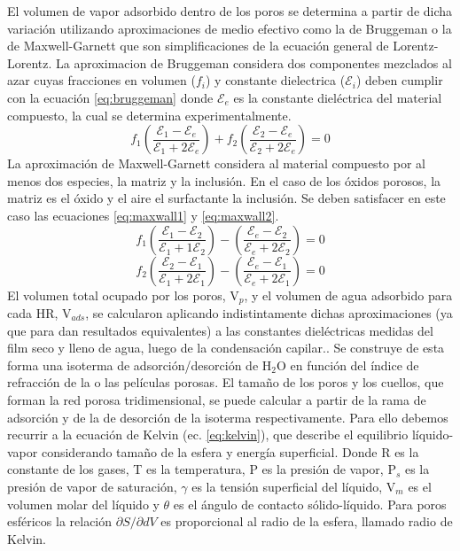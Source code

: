 		El volumen de vapor adsorbido dentro de los poros se determina a partir de dicha variación utilizando aproximaciones de medio efectivo como la de Bruggeman\cite{Bruggeman1935} o la de Maxwell-Garnett\cite{Garnett1906} que son simplificaciones de la ecuación general de Lorentz-Lorentz\cite{TompkinsHarlandG.1999}.
		La aproximacion de Bruggeman considera dos componentes mezclados al azar cuyas fracciones en volumen ($f_i$) y constante dielectrica ($\mathcal{E}_i$) deben cumplir con la ecuación \ref{eq:bruggeman} donde $\mathcal{E}_e$ es la constante dieléctrica del material compuesto, la cual se determina experimentalmente.
							\begin{equation}
					 		   	 f_1\left(\frac{\mathcal{E}_1-\mathcal{E}_e}{\mathcal{E}_1+2\mathcal{E}_e}\right)+
					 		   	 f_2\left(\frac{\mathcal{E}_2-\mathcal{E}_e}{\mathcal{E}_2+2\mathcal{E}_e}\right)=0
					 		     \label{eq:bruggeman}
								\end{equation}
		La aproximación de Maxwell-Garnett considera al material compuesto por al menos dos especies, la matriz y la inclusión. En el caso de los óxidos porosos, la matriz es el óxido y el aire el surfactante la inclusión. Se deben satisfacer en este caso las ecuaciones \ref{eq:maxwall1} y \ref{eq:maxwall2}.
							\begin{equation}
					 		   	 f_1\left(\frac{\mathcal{E}_1-\mathcal{E}_2}{\mathcal{E}_1+1\mathcal{E}_2}\right)-
					 		   	 \left(\frac{\mathcal{E}_e-\mathcal{E}_2}{\mathcal{E}_e+2\mathcal{E}_2}\right)=0
					 		     \label{eq:maxwall1}
								\end{equation}
								\begin{equation}
					 		   	 f_2\left(\frac{\mathcal{E}_2-\mathcal{E}_1}{\mathcal{E}_1+2\mathcal{E}_1}\right)-
					 		   	 \left(\frac{\mathcal{E}_e-\mathcal{E}_1}{\mathcal{E}_e+2\mathcal{E}_1}\right)=0
					 		     \label{eq:maxwall2}
								\end{equation}
		El volumen total ocupado por los poros, V$_p$, y el volumen de agua adsorbido para cada HR, V$_{ads}$, se calcularon aplicando indistintamente dichas aproximaciones (ya que para \pdm\space dan resultados equivalentes) a las constantes dieléctricas medidas del film seco y lleno de agua, luego de la condensación capilar.\cite{Angelome2008,Fuertes2009,Nano-compuestas2013}. Se construye de esta forma una isoterma de adsorción/desorción de H$_2$O en función del índice de refracción de la o las películas porosas.
		El tamaño de los poros y los cuellos, que forman la red porosa tridimensional, se puede calcular a partir de la rama de adsorción y de la de desorción de la isoterma respectivamente. Para ello debemos recurrir a la ecuación de Kelvin (ec. \ref{eq:kelvin}), que describe el equilibrio líquido-vapor considerando tamaño de la esfera y energía superficial. Donde R es la constante de los gases, T es la temperatura, P es la presión de vapor, P$_s$ es la presión de vapor de saturación, $\gamma$ es la tensión superficial del líquido, V$_m$ es el volumen molar del líquido y $\theta$ es el ángulo de contacto sólido-líquido. \cite{Baklanov2000,Boissiere2005,Sing1985} Para poros esféricos la relación $\partial S/ \partial dV$ es proporcional al radio de la esfera, llamado radio de Kelvin.\cite{FernandezPrini2005}
